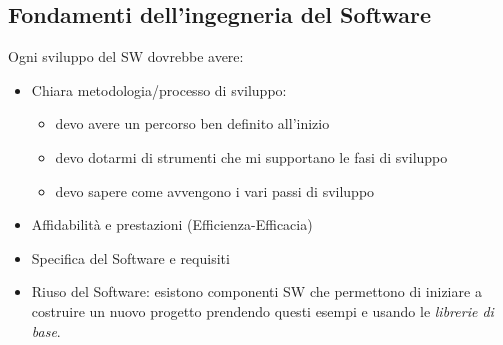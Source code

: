 \documentclass[a4paper, 10pt]{article}
\begin{document}
	\subsection{Fondamenti dell'ingegneria del Software}
		Ogni sviluppo del SW dovrebbe avere:
		\begin{itemize}
			\item Chiara metodologia/processo di sviluppo:
			\begin{itemize}
				\item devo avere un percorso ben definito all'inizio
				\item devo dotarmi di strumenti che mi supportano le fasi di sviluppo
				\item devo sapere come avvengono i vari passi di sviluppo
			\end{itemize}
			\item Affidabilità e prestazioni (Efficienza-Efficacia)
			\item Specifica del Software e requisiti
			\item Riuso del Software: esistono componenti SW che permettono di iniziare a costruire un nuovo progetto prendendo questi esempi e usando le \textit{librerie di base}.
		\end{itemize}
		
\end{document}
